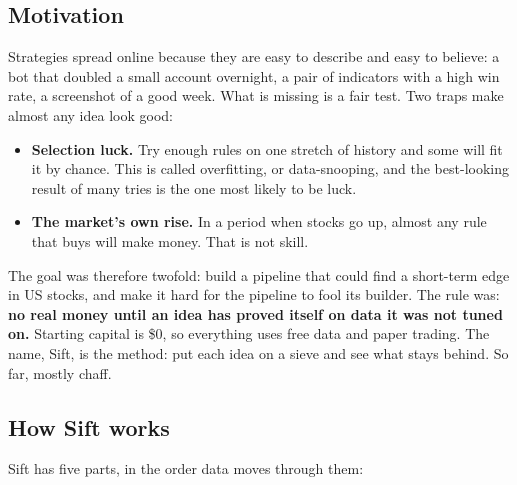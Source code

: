 \documentclass[11pt,a4paper]{article}
\providecommand{\tightlist}{\setlength{\itemsep}{0pt}\setlength{\parskip}{0pt}}
\begin{document}
\subsection{Motivation}\label{sec:motivation}

Strategies spread online because they are easy to describe and easy to believe: a bot that doubled a small account
overnight, a pair of indicators with a high win rate, a screenshot of a good week. What is missing is a fair test. Two
traps make almost any idea look good:

\begin{itemize}
\tightlist
\item
  \textbf{Selection luck.} Try enough rules on one stretch of history and some will fit it by chance. This is called
  overfitting, or data-snooping, and the best-looking result of many tries is the one most likely to be luck.
\item
  \textbf{The market's own rise.} In a period when stocks go up, almost any rule that buys will make money. That is not skill.
\end{itemize}

The goal was therefore twofold: build a pipeline that could find a short-term edge in US stocks, and make it hard for the
pipeline to fool its builder. The rule was: \textbf{no real money until an idea has proved itself on data it was not tuned on.}
Starting capital is \$0, so everything uses free data and paper trading. The name, Sift, is the method: put each idea on a
sieve and see what stays behind. So far, mostly chaff.

\subsection{How Sift works}\label{sec:how}

Sift has five parts, in the order data moves through them:
\end{document}
